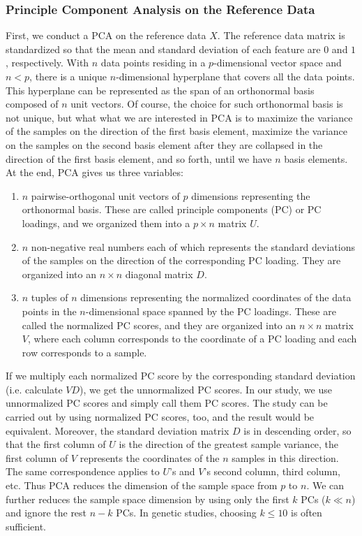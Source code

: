 \documentclass{article}
\begin{document}
\subsubsection{Principle Component Analysis on the Reference Data}
First, we conduct a PCA on the reference data $X$.
The reference data matrix is standardized
so that the mean and standard deviation of each feature are $0$ and $1$, respectively.
With $n$ data points residing in a $p$-dimensional vector space and $n < p$,
there is a unique $n$-dimensional hyperplane that covers all the data points.
This hyperplane can be represented as the span of an orthonormal basis composed of $n$ unit vectors.
Of course, the choice for such orthonormal basis is not unique,
but what what we are interested in PCA is 
to maximize the variance of the samples on the direction of the first basis element,
maximize the variance on the samples on the second basis element after they are collapsed in the direction of the first basis element,
and so forth,
until we have $n$ basis elements.
At the end, PCA gives us three variables:
\begin{enumerate}
    \item $n$ pairwise-orthogonal unit vectors of $p$ dimensions
    representing the orthonormal basis.
    These are called principle components (PC) or PC loadings,
    and we organized them into a $p \times n$ matrix $U$.
    \item $n$ non-negative real numbers
    each of which represents the standard deviations of the samples
    on the direction of the corresponding PC loading.
    They are organized into an $n \times n$ diagonal matrix $D$.
    \item $n$ tuples of $n$ dimensions
    representing the normalized coordinates of the data points
    in the $n$-dimensional space spanned by the PC loadings.
    These are called the normalized PC scores,
    and they are organized into an $n \times n$ matrix $V$,
    where each column corresponds to the coordinate of a PC loading
    and each row corresponds to a sample.
\end{enumerate}
If we multiply each normalized PC score by the corresponding standard deviation
(i.e. calculate $VD$),
we get the unnormalized PC scores.
In our study, we use unnormalized PC scores and simply call them PC scores.
The study can be carried out by using normalized PC scores, too,
and the result would be equivalent.
Moreover, the standard deviation matrix $D$ is in descending order,
so that the first column of $U$ is the direction of the greatest sample variance,
the first column of $V$ represents the coordinates of the $n$ samples in this direction.
The same correspondence applies to $U$'s and $V$'s second column, third column, etc.
Thus PCA reduces the dimension of the sample space from $p$ to $n$.
We can further reduces the sample space dimension
by using only the first $k$ PCs ($k \ll n$) and ignore the rest $n-k$ PCs.
In genetic studies, choosing $k \leq 10$ is often sufficient.
\end{document}
